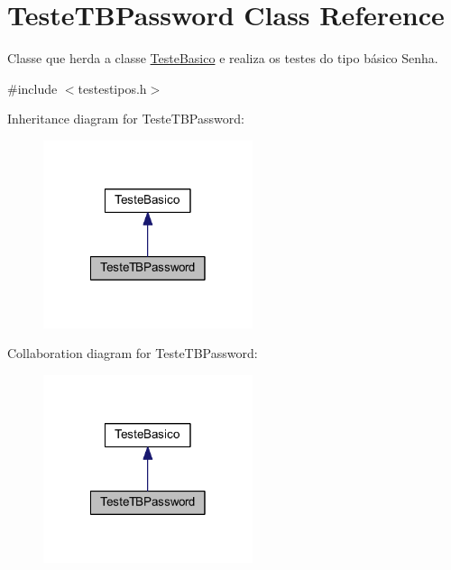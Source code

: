 \hypertarget{class_teste_t_b_password}{\section{Teste\-T\-B\-Password Class Reference}
\label{class_teste_t_b_password}
}


Classe que herda a classe \hyperlink{class_teste_basico}{Teste\-Basico} e realiza os testes do tipo básico Senha.  




{\ttfamily \#include $<$testestipos.\-h$>$}



Inheritance diagram for Teste\-T\-B\-Password\-:\nopagebreak
\begin{figure}[H]
\begin{center}
\leavevmode
\includegraphics[width=174pt]{class_teste_t_b_password__inherit__graph}
\end{center}
\end{figure}


Collaboration diagram for Teste\-T\-B\-Password\-:\nopagebreak
\begin{figure}[H]
\begin{center}
\leavevmode
\includegraphics[width=174pt]{class_teste_t_b_password__coll__graph}
\end{center}
\end{figure}
